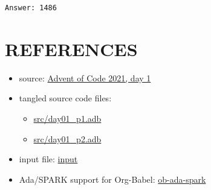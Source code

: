 \documentclass[11pt]{article}
\begin{document}
\begin{verbatim}
Answer: 1486
\end{verbatim}

\section{REFERENCES}
\label{sec:org1833ee6}

\begin{itemize}
\item source: \href{https://adventofcode.com/2021/day/1}{Advent of Code 2021, day 1}
\item tangled source code files:
\begin{itemize}
\item \url{src/day01\_p1.adb}
\item \url{src/day01\_p2.adb}
\end{itemize}
\item input file: \url{input}
\item Ada/SPARK support for Org-Babel: \href{https://github.com/rocher/ob-ada-spark}{ob-ada-spark}
\end{itemize}
\end{document}
